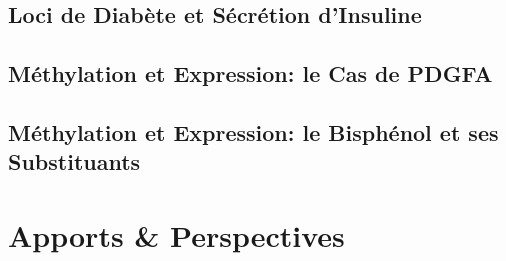 \documentclass[11pt]{article} %
\begin{document}
\subsection{Loci de Diabète et Sécrétion d'Insuline}
\par{}

\subsection{Méthylation et Expression: le Cas de PDGFA}
\par{}

\subsection{Méthylation et Expression: le Bisphénol et ses Substituants}
\par{}

\section{Apports \& Perspectives}
\par{}
\end{document}
